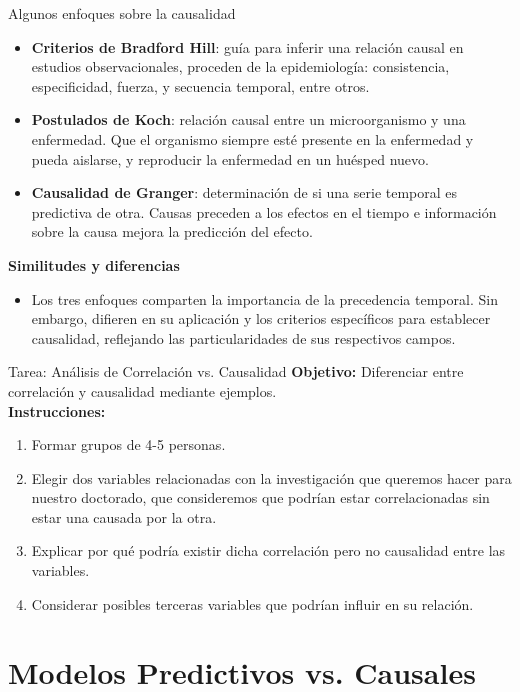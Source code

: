 ﻿\documentclass{beamer}
\begin{document}
\begin{frame}{Algunos enfoques sobre la causalidad}
\begin{itemize}
    \item \textbf{Criterios de Bradford Hill}: guía para inferir una relación causal en estudios observacionales, proceden de la epidemiología: consistencia, especificidad, fuerza, y secuencia temporal, entre otros.
    \item \textbf{Postulados de Koch}: relación causal entre un microorganismo y una enfermedad. Que el organismo siempre esté presente en la enfermedad y pueda aislarse, y reproducir la enfermedad en un huésped nuevo.
    \item \textbf{Causalidad de Granger}: determinación de si una serie temporal es predictiva de otra. Causas preceden a los efectos en el tiempo e información sobre la causa mejora la predicción del efecto.
\end{itemize}

\textbf{Similitudes y diferencias}
\begin{itemize}
    \item Los tres enfoques comparten la importancia de la precedencia temporal. Sin embargo, difieren en su aplicación y los criterios específicos para establecer causalidad, reflejando las particularidades de sus respectivos campos.
\end{itemize}
\end{frame}

\begin{frame}{Tarea: Análisis de Correlación vs. Causalidad}
    \textbf{Objetivo:} Diferenciar entre correlación y causalidad mediante ejemplos.\\[10pt]
    \textbf{Instrucciones:}
    \begin{enumerate}
        \item Formar grupos de 4-5 personas.
        \item Elegir dos variables relacionadas con la investigación que queremos hacer para nuestro doctorado, que consideremos que podrían estar correlacionadas sin estar una causada por la otra.
        \item Explicar por qué podría existir dicha correlación pero no causalidad entre las variables.
        \item Considerar posibles terceras variables que podrían influir en su relación.
    \end{enumerate}
\end{frame}

\section{Modelos Predictivos vs. Causales}
\end{document}
